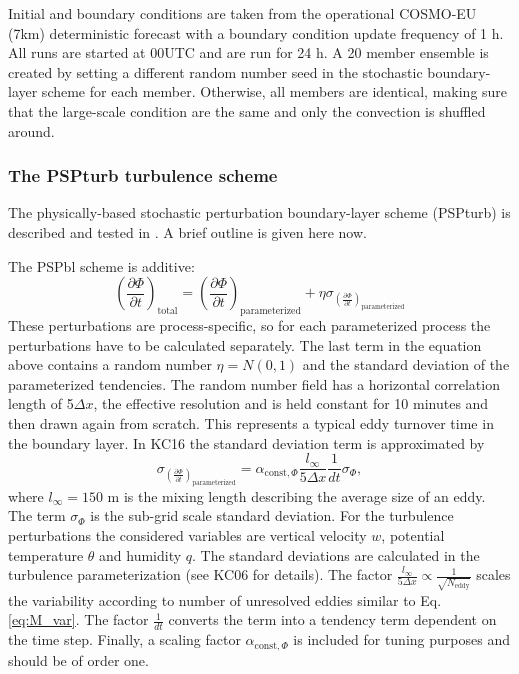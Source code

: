 \documentclass[a4paper, 12pt, draft]{article}
\begin{document}
Initial and boundary conditions are taken from the operational COSMO-EU (7km) deterministic forecast with a boundary condition update frequency of 1 h. All runs are started at 00UTC and are run for 24 h. A 20 member ensemble is created by setting a different random number seed in the stochastic boundary-layer scheme for each member. Otherwise, all members are identical, making sure that the large-scale condition are the same and only the convection is shuffled around. 

\subsubsection{The PSPturb turbulence scheme}
The physically-based stochastic perturbation boundary-layer scheme (PSPturb) is described and tested in \cite[][KC16]{Kober2016}. A brief outline is given here now. 

The PSPbl scheme is additive:
\begin{equation} \label{eq:PSPturb_additive}
\left( \frac{\partial \Phi}{\partial t} \right)_{\mathrm{total}} = \left( \frac{\partial \Phi}{\partial t} \right)_{\mathrm{parameterized}} + \eta \sigma_{\left( \frac{\partial \Phi}{\partial t} \right)_{\mathrm{parameterized}}}
\end{equation}
These perturbations are process-specific, so for each parameterized process the perturbations have to be calculated separately. The last term in the equation above contains a random number $\eta = \mathit{N}(0,1)$ and the standard deviation of the parameterized tendencies. The random number field has a horizontal correlation length of 5$\Delta x$, the effective resolution and is held constant for 10 minutes and then drawn again from scratch. This represents a typical eddy turnover time in the boundary layer. In KC16 the standard deviation term is approximated by
\begin{equation} \label{eq:PSPturb_std}
\sigma_{\left( \frac{\partial \Phi}{\partial t} \right)_{\mathrm{parameterized}}} = \alpha_{\mathrm{const}, \Phi} \frac{\mathit{l_{\infty}}}{5 \Delta x}\frac{1}{dt} \sigma_{\Phi},
\end{equation}
where $\mathit{l_{\infty}} = 150$ m is the mixing length describing the average size of an eddy. The term $\sigma_{\Phi}$ is the sub-grid scale standard deviation. For the turbulence perturbations the considered variables are vertical velocity $w$, potential temperature $\theta$ and humidity $q$. The standard deviations are calculated in the turbulence parameterization (see KC06 for details). The factor $\frac{\mathit{l_{\infty}}}{5 \Delta x} \propto \frac{1}{\sqrt{N_{\mathrm{eddy}}}}$ scales the variability according to number of unresolved eddies similar to Eq. \ref{eq:M_var}. The factor $\frac{1}{dt}$  converts the term into a tendency term dependent on the time step. Finally, a scaling factor $\alpha_{\mathrm{const}, \Phi}$ is included for tuning purposes and should be of order one.
\end{document}
